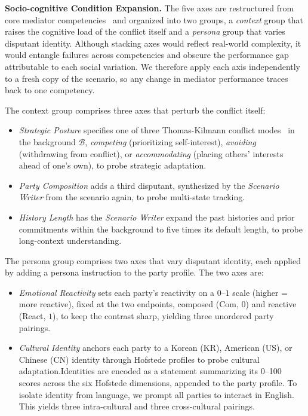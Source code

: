 \smallskip\smallskip\noindent\textbf{{Socio-cognitive Condition Expansion.}}
The five axes are restructured from core mediator competencies~\citep{susskind1999consensus,bowling2000bringing,lebaron2003bridging} and organized into two groups, a \emph{context} group that raises the cognitive load of the conflict itself and a \emph{persona} group that varies disputant identity. Although stacking axes would reflect real-world complexity, it would entangle failures across competencies and obscure the performance gap attributable to each social variation. We therefore apply each axis independently to a fresh copy of the scenario, so any change in mediator performance traces back to one competency. 

The context group comprises three axes that perturb the conflict itself:
\begin{itemize}[leftmargin=*, noitemsep, topsep=2pt]
\item \emph{Strategic Posture} specifies one of three Thomas-Kilmann conflict modes~\citep{thomas2008thomas} in the background $\mathcal{B}$, \emph{competing} (prioritizing self-interest), \emph{avoiding} (withdrawing from conflict), or \emph{accommodating} (placing others' interests ahead of one's own), to probe strategic adaptation.
\item \emph{Party Composition} adds a third disputant, synthesized by the \textit{Scenario Writer} from the scenario again, to probe multi-state tracking.
\item \emph{History Length} has the \textit{Scenario Writer} expand the past histories and prior commitments within the background to five times its default length, to probe long-context understanding.
\end{itemize}



The persona group comprises two axes that vary disputant identity, each applied by adding a persona instruction to the party profile. The two axes are:
\begin{itemize}[leftmargin=*, noitemsep, topsep=2pt]
\item \emph{Emotional Reactivity} sets each party's reactivity on a $0$--$1$ scale (higher = more reactive), fixed at the two endpoints, composed (Com, $0$) and reactive (React, $1$), to keep the contrast sharp, yielding three unordered party pairings.
\item \emph{Cultural Identity} anchors each party to a Korean (KR), American (US), or Chinese (CN) identity through Hofstede profiles to probe cultural adaptation.\footnotemark[2] Identities are encoded as a statement summarizing its 0--100 scores across the six Hofstede dimensions, appended to the party profile. To isolate identity from language, we prompt all parties to interact in English. This yields three intra-cultural and three cross-cultural pairings.
\end{itemize}

